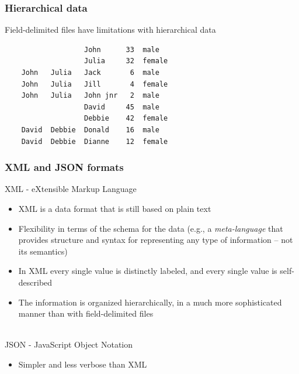 \documentclass[svgnames]{beamer}
\begin{document}
\begin{frame}[fragile]
\frametitle{Hierarchical data}

Field-delimited files have limitations with hierarchical data
\bigskip

\begin{verbatim}
                   John      33  male
                   Julia     32  female
    John   Julia   Jack       6  male
    John   Julia   Jill       4  female
    John   Julia   John jnr   2  male
                   David     45  male
                   Debbie    42  female
    David  Debbie  Donald    16  male
    David  Debbie  Dianne    12  female
\end{verbatim}

\end{frame}


\begin{frame}
\frametitle{XML and JSON formats}

XML - eXtensible Markup Language
\begin{itemize}
  \item XML is a data format that is still based on plain text
  \item Flexibility in terms of the schema for the data (e.g., a \emph{meta-language} that provides structure and syntax for representing any type of information -- not its semantics)
  \item In XML every single value is distinctly labeled, and every single value is self-described
  \item The information is organized hierarchically, in a much more sophisticated manner than with field-delimited files 
\end{itemize}

~\\

JSON - JavaScript Object Notation
\begin{itemize}
\item Simpler and less verbose than XML
\end{itemize}

\end{frame}

\end{document}
